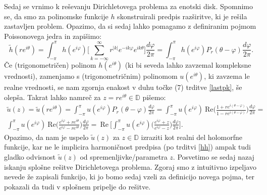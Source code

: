 \documentclass[mat1]{fmfdelo}
\begin{document}
    Sedaj se vrnimo k reševanju Dirichletovega problema za enotski disk. 
    Spomnimo se, da smo za polinomske funkcije $h$ skonstruirali predpis razširitve, ki je rešila zastavljen problem. 
    Opazimo, da si sedaj lahko pomagamo z definiranim pojmom Poissonovega jedra in zapišimo:
    $$
    \widetilde{h}(r e^{i \theta}) = \int_{-\pi}^{\pi}{h(e^{i \varphi}) \bigg[\sum_{k = - \infty}^{\infty} r^{|k|} e^{- i k \varphi} e^{i k \theta}} \bigg]\frac{d \varphi}{2 \pi} = 
    \int_{-\pi}^{\pi}{h(e^{i \varphi}) P_r(\theta - \varphi)\frac{d \varphi}{2 \pi}}.
    $$
    Če (trigonometričen) polinom $h(e^{i\theta})$ (ki  bi seveda lahko zavzemal kompleksne vrednosti), zamenjamo s (trigonometričnim) polinomom $u(e^{i\theta})$, ki zavzema le realne vrednosti, se nam zgornja enakost v duhu 
    točke (7) trditve \ref{lastpk}, še olepša. Takrat lahko namreč za $z = re^{i\theta} \in \mathbb{D}$ pišemo:
    \begin{equation}
        \label{realnidel}
        \begin{split}
            \widetilde{u}(z) = \widetilde{u}(r e^{i \theta}) = \int_{-\pi}^{\pi}{u(e^{i \varphi}) P_r(\theta - \varphi)\frac{d \varphi}{2 \pi}} = \int_{-\pi}^{\pi}{u(e^{i \varphi})~\text{Re}\bigg(\frac{1+re^{i(\theta - \varphi)}}{1-re^{i(\theta - \varphi)}}\bigg)\frac{d \varphi}{2 \pi}}= \\
            \int_{-\pi}^{\pi}{u(e^{i \varphi})~\text{Re}\bigg(\frac{e^{i\varphi}+re^{i\theta}}{e^{i\varphi}-re^{i\theta}}\bigg)\frac{d \varphi}{2 \pi}}=~\text{Re}~\bigg[\int_{-\pi}^{\pi}{u(e^{i \varphi})\bigg(\frac{e^{i\varphi}+z}{e^{i\varphi}-z}\bigg)\frac{d \varphi}{2 \pi}}\bigg].
        \end{split}
    \end{equation}
    Opazimo, da nam je uspelo $\widetilde{u}(z)$ za $z \in \mathbb{D}$ izraziti kot realni del holomorfne funkcije, kar ne le implicira harmoničnost predpisa (po trditvi \ref{hh}) ampak tudi gladko odvisnost $\widetilde{u}(z)$ od spremenljivke/parametra $z$.
    \newline
    Posvetimo se sedaj nazaj iskanju splošne rešitve Dirichletovega problema. Zgoraj smo z intuitivno izpeljavo nevede že zapisali funkcijo, ki jo bomo sedaj vzeli za definicijo novega pojma, ter pokazali da tudi v splošnem pripelje do rešitve.
\end{document}
